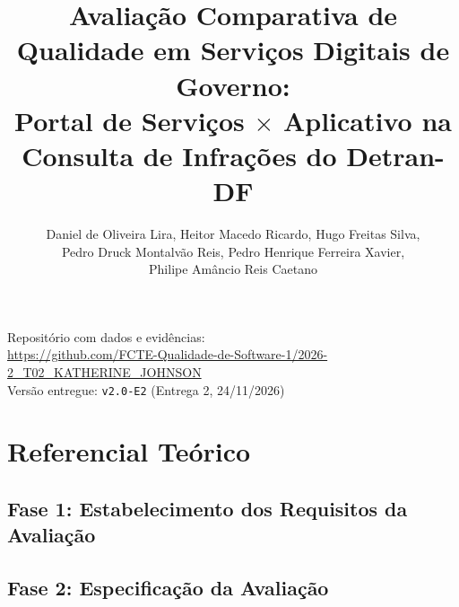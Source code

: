 \documentclass[12pt]{article}
\title{Avaliação Comparativa de Qualidade em Serviços Digitais de Governo:\\
  Portal de Serviços $\times$ Aplicativo na Consulta de Infrações do Detran-DF}
\author{Daniel de Oliveira Lira, Heitor Macedo Ricardo, Hugo Freitas Silva,\\
  Pedro Druck Montalvão Reis, Pedro Henrique Ferreira Xavier,\\
  Philipe Amâncio Reis Caetano}
\newcommand{\incluir}[1]{}
\begin{document}
\maketitle

\begin{center}
  \small Repositório com dados e evidências:\\
  \url{https://github.com/FCTE-Qualidade-de-Software-1/2026-2_T02_KATHERINE_JOHNSON}\\
  Versão entregue: \texttt{v2.0-E2} (Entrega 2, 24/11/2026)
\end{center}

\incluir{secoes/resumo}
\incluir{secoes/introducao}

\section{Referencial Teórico}
\label{sec:referencial-teorico}
\incluir{secoes/referencial-square}
\incluir{secoes/referencial-gqm}

\incluir{secoes/metodologia}

\subsection{Fase 1: Estabelecimento dos Requisitos da Avaliação}
\label{sec:fase1}
\incluir{secoes/fase1-proposito}
\incluir{secoes/fase1-produto}
\incluir{secoes/fase1-priorizacao}

\FloatBarrier
\subsection{Fase 2: Especificação da Avaliação}
\label{sec:fase2-gqm}
\incluir{secoes/fase2-objetivos}
\incluir{secoes/fase2-metricas}

\FloatBarrier
\incluir{secoes/fase3-plano}

\FloatBarrier
\incluir{secoes/fase4-analise}

\incluir{secoes/fase4-conclusoes}

\FloatBarrier
\incluir{secoes/declaracao-ia}

\FloatBarrier



\appendix
\incluir{secoes/contribuicao}
\end{document}
